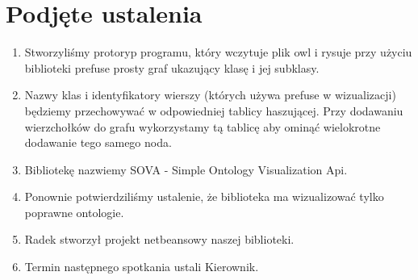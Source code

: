 \documentclass[a4paper,10pt]{article}
\begin{document}
\section{Podjęte ustalenia}
\begin{enumerate}
\item Stworzyliśmy protoryp programu, który wczytuje plik owl i rysuje przy użyciu biblioteki prefuse prosty graf ukazujący klasę i jej subklasy.
\item Nazwy klas i identyfikatory wierszy (których używa prefuse w wizualizacji) będziemy przechowywać w odpowiedniej tablicy haszującej. Przy dodawaniu wierzchołków do grafu wykorzystamy tą tablicę aby ominąć wielokrotne dodawanie tego samego noda.
\item Bibliotekę nazwiemy SOVA - Simple Ontology Visualization Api.
\item Ponownie potwierdziliśmy ustalenie, że biblioteka ma wizualizować tylko poprawne ontologie.
\item Radek stworzył projekt netbeansowy naszej biblioteki.
\item Termin następnego spotkania ustali Kierownik.
\end{enumerate}
\end{document}
